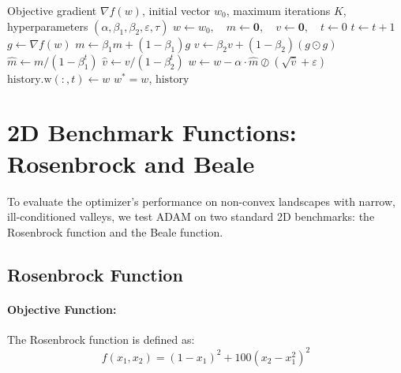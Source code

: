 \documentclass[11pt,a4paper]{article}
\begin{document}
\begin{algorithm}[H]
\caption{ADAM Optimizer Engine (\texttt{adam\_optimizer.m})}\label{alg:adam}
\begin{algorithmic}[1]
\Require Objective gradient $\nabla f(w)$, initial vector $w_0$, maximum iterations $K$, hyperparameters $(\alpha, \beta_1, \beta_2, \varepsilon, \tau)$
\State $w \leftarrow w_0, \quad m \leftarrow \mathbf{0}, \quad v \leftarrow \mathbf{0}, \quad t \leftarrow 0$
    \State $t \leftarrow t + 1$
    \State $g \leftarrow \nabla f(w)$
    \State $m \leftarrow \beta_1 m + (1 - \beta_1) g$ 
    \State $v \leftarrow \beta_2 v + (1 - \beta_2) (g \odot g)$ 
    \State $\hat{m} \leftarrow m / (1 - \beta_1^t)$ 
    \State $\hat{v} \leftarrow v / (1 - \beta_2^t)$ 
    \State $w \leftarrow w - \alpha \cdot \hat{m} \oslash (\sqrt{\hat{v}} + \varepsilon)$ 
    \State $\text{history.w}(:, t) \leftarrow w$
\EndWhile
\State \Return $w^* = w$, $\text{history}$
\end{algorithmic}
\end{algorithm}

\section{2D Benchmark Functions: Rosenbrock and Beale}\label{sec:bench2d}

To evaluate the optimizer's performance on non-convex landscapes with narrow, ill-conditioned valleys, we test ADAM on two standard 2D benchmarks: the Rosenbrock function and the Beale function.

\subsection{Rosenbrock Function}

\paragraph{Objective Function:}
The Rosenbrock function \cite{rosenbrock1960automatic} is defined as:
\begin{equation}
    f(x_1, x_2) = (1 - x_1)^2 + 100(x_2 - x_1^2)^2
\end{equation}
\end{document}
